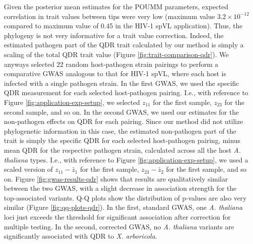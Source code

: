 \documentclass[11pt]{article}
\begin{document}
\begin{linenumbers}
Given the posterior mean estimates for the POUMM parameters, expected correlation in trait values between tips were very low (maximum value $3.2 \times 10^{-12}$ compared to maximum value of 0.45 in the HIV-1 spVL application). Thus, the phylogeny is not very informative for a trait value correction. Indeed, the estimated pathogen part of the QDR trait calculated by our method is simply a scaling of the total QDR trait value (Figure \ref{fig:trait-comparison-qdr}). We anyways selected 22 random host-pathogen strain pairings to perform a comparative GWAS analogous to that for HIV-1 spVL, where each host is infected with a single pathogen strain. In the first GWAS, we used the specific QDR measurement for each selected host-pathogen pairing. I.e., with reference to Figure \ref{fig:application-exp-setup}, we selected $z_{11}$ for the first sample, $z_{23}$ for the second sample, and so on. In the second GWAS, we used our estimates for the non-pathogen effects on QDR for each pairing. Since our method did not utilize phylogenetic information in this case, the estimated non-pathogen part of the trait is simply the specific QDR for each selected host-pathogen pairing, minus mean QDR for the respective pathogen strain, calculated across all the host \emph{A. thaliana} types. I.e., with reference to Figure \ref{fig:application-exp-setup}, we used a scaled version of $z_{11} - \bar{z}_1$ for the first sample, $z_{23} - \bar{z}_2$ for the first sample, and so on. Figure \ref{fig:gwas-results-qdr} shows that results are qualitatively similar between the two GWAS, with a slight decrease in association strength for the top-associated variants. Q-Q plots show the distribution of p-values are also very similar (Figure \ref{fig:qq-plots-qdr}). In the first, standard GWAS, one \emph{A. thaliana} loci just exceeds the threshold for significant association after correction for multiple testing. In the second, corrected GWAS, no \emph{A. thaliana} variants are significantly associated with QDR to \emph{X. arboricola}.


\end{linenumbers}
\end{document}
